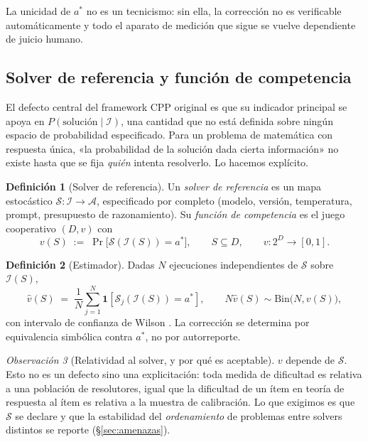 \documentclass[11pt,a4paper]{article}
\theoremstyle{definition}
\newtheorem{definicion}{Definición}[section]
\theoremstyle{plain}
\theoremstyle{remark}
\newtheorem{observacion}[definicion]{Observación}
\newcommand{\ind}[1]{\mathbf{1}\!\left[#1\right]}
\newcommand{\solver}{\mathcal{S}}
\newcommand{\Info}{\mathcal{I}}
\begin{document}
La unicidad de $a^\ast$ no es un tecnicismo: sin ella, la corrección no es
verificable automáticamente y todo el aparato de medición que sigue se vuelve
dependiente de juicio humano.

\subsection{Solver de referencia y función de competencia}

El defecto central del framework CPP original es que su indicador principal se
apoya en $P(\text{solución}\mid \Info)$, una cantidad que no está definida sobre
ningún espacio de probabilidad especificado. Para un problema de matemática con
respuesta única, «la probabilidad de la solución dada cierta información» no
existe hasta que se fija \emph{quién} intenta resolverlo. Lo hacemos explícito.

\begin{definicion}[Solver de referencia]\label{def:solver}
Un \emph{solver de referencia} es un mapa estocástico
$\solver:\Info\to\mathcal{A}$, especificado por completo (modelo, versión,
temperatura, prompt, presupuesto de razonamiento). Su \emph{función de
competencia} es el juego cooperativo $(D,v)$ con
\[
  v(S) \;:=\; \Pr\big[\solver(\Info(S)) = a^\ast\big],
  \qquad S\subseteq D, \qquad v:2^{D}\to[0,1].
\]
\end{definicion}

\begin{definicion}[Estimador]\label{def:estimador}
Dadas $N$ ejecuciones independientes de $\solver$ sobre $\Info(S)$,
\[
  \hat v(S) \;=\; \frac{1}{N}\sum_{j=1}^{N}\ind{\solver_j(\Info(S)) = a^\ast},
  \qquad N\hat v(S)\sim \mathrm{Bin}\big(N, v(S)\big),
\]
con intervalo de confianza de Wilson \citep{wilson1927probable}. La corrección se
determina por equivalencia simbólica contra $a^\ast$, no por autorreporte.
\end{definicion}

\begin{observacion}[Relatividad al solver, y por qué es aceptable]
$v$ depende de $\solver$. Esto no es un defecto sino una explicitación: toda
medida de dificultad es relativa a una población de resolutores, igual que la
dificultad de un ítem en teoría de respuesta al ítem es relativa a la muestra de
calibración. Lo que exigimos es que $\solver$ se declare y que la estabilidad del
\emph{ordenamiento} de problemas entre solvers distintos se reporte
(§\ref{sec:amenazas}).
\end{observacion}
\end{document}
